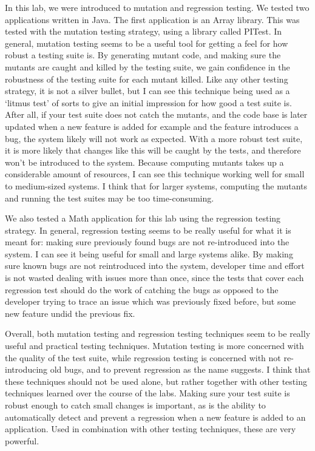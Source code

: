 In this lab, we were introduced to mutation and regression testing.  We tested
two applications written in Java. The first application is an Array library.
This was tested with the mutation testing strategy, using a library called
PITest. 
In general, mutation testing seems to be a useful tool for getting a feel for
how robust a testing suite is. By generating mutant code, and making sure the
mutants are caught and killed by the testing suite, we gain confidence in the
robustness of the testing suite for each mutant killed. Like any other testing
strategy, it is not a silver bullet, but I can see this technique being used as
a `litmus test' of sorts to give an initial impression for how good a test suite
is. After all, if your test suite does not catch the mutants, and the code base
is later updated when a new feature is added for example and the feature
introduces a bug, the system likely will not work as expected. With a more robust
test suite, it is more likely that changes like this will be caught by the
tests, and therefore won't be introduced to the system. Because computing
mutants takes up a considerable amount of resources, I can see this technique
working well for small to medium-sized systems. I think that for larger systems,
computing the mutants and running the test suites may be too time-consuming.

We also tested a Math application for this lab using the regression testing
strategy. In general, regression testing seems to be really useful for what it
is meant for: making sure previously found bugs are not re-introduced into the
system. I can see it being useful for small and large systems alike. By making
sure known bugs are not reintroduced into the system, developer time and effort
is not wasted dealing with issues more than once, since the tests that cover
each regression test should do the work of catching the bugs as opposed to the
developer trying to trace an issue which was previously fixed before, but some
new feature undid the previous fix. 

Overall, both mutation testing and regression testing techniques seem to be
really useful and practical testing techniques. Mutation testing is more
concerned with the quality of the test suite, while regression testing is
concerned with not re-introducing old bugs, and to prevent regression as the name
suggests. I think that these techniques should not be used alone, but rather
together with other testing techniques learned over the course of the labs.
Making sure your test suite is robust enough to catch small changes is
important, as is the ability to automatically detect and prevent a regression
when a new feature is added to an application. Used in combination with other
testing techniques, these are very powerful. 
